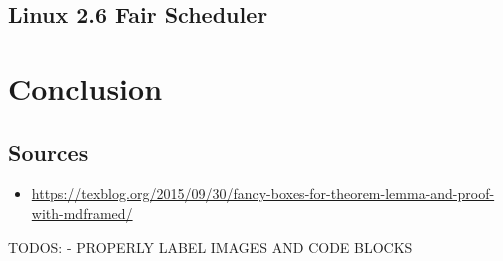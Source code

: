 \documentclass{report}
\begin{document}
\chapter{Linux 2.6 Fair Scheduler}



\part{Conclusion}

\chapter*{Sources}

\begin{itemize}
    \item \url{https://texblog.org/2015/09/30/fancy-boxes-for-theorem-lemma-and-proof-with-mdframed/}
\end{itemize}


TODOS:
- PROPERLY LABEL IMAGES AND CODE BLOCKS
\end{document}
